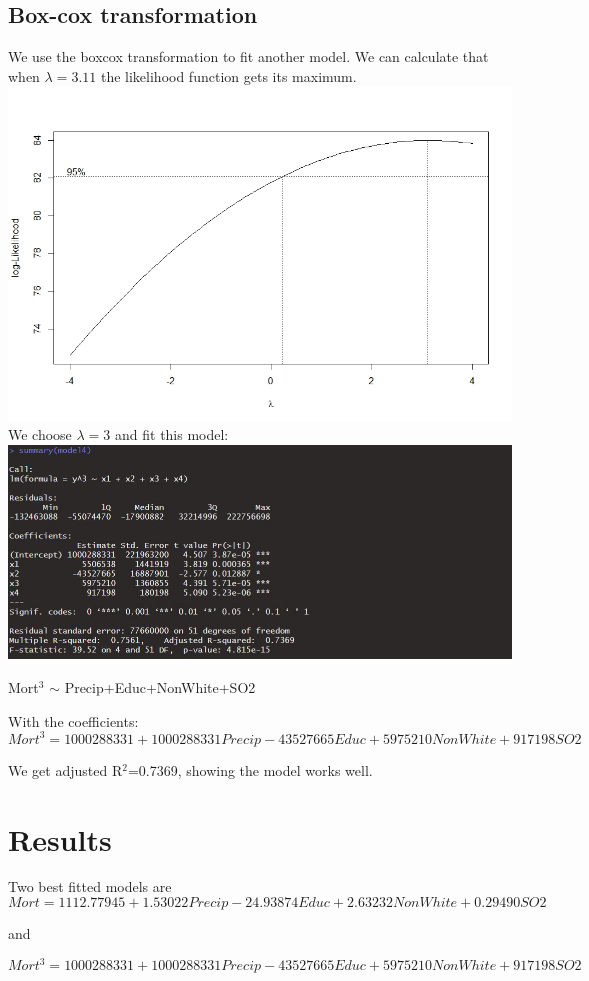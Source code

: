 \documentclass[12pt,a4paper]{article}
\begin{document}
\subsection{Box-cox transformation}
We use the boxcox transformation to fit another model. We can calculate that when $\lambda=3.11$ the likelihood function gets its maximum.\\
\includegraphics[scale=0.6]{boxcox.jpeg}
\newline
We choose $\lambda=3$ and fit this model:
\newline
\includegraphics[scale=0.6]{BOXCOX.JPG}
\begin{center}
Mort$^3$ $\sim$ Precip+Educ+NonWhite+SO2\\
\end{center}
With the coefficients:\[Mort^3=1000288331+1000288331Precip-43527665Educ+5975210NonWhite+917198SO2\]

We get adjusted R$^2$=0.7369, showing the model works well.
\section{Results}
Two best fit{}ted models are\[Mort=1112.77945+1.53022Precip-24.93874Educ+2.63232NonWhite+0.29490SO2\] 
\begin{center}
and
\end{center}\[Mort^3=1000288331+1000288331Precip-43527665Educ+5975210NonWhite+917198SO2\]
\end{document}
